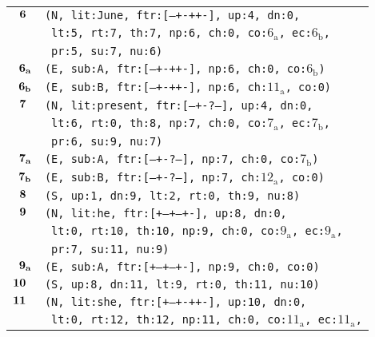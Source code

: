\documentclass{article}
\begin{document}
\begin{minipage}{\textwidth}
{\begin{tabular}{|r|l|}
    ${\textbf{\textrm{6}}_{\phantom{z}}}$ & \texttt{\texttt{(N,~lit:June,~ftr:[---+-++-],~up:4,~dn:0,}} \\
    & \texttt{\texttt{~lt:5,~rt:7,~th:7,~np:6,~ch:0,~co:${\textrm{6}_{\textrm{a}}}$,~ec:${\textrm{6}_{\textrm{b}}}$,}} \\
    & \texttt{\texttt{~pr:5,~su:7,~nu:6)}} \\
    ${\textbf{\textrm{6}}_{\textbf{\textrm{a}}}}$ & \texttt{\texttt{(E,~sub:A,~ftr:[---+-++-],~np:6,~ch:0,~co:${\textrm{6}_{\textrm{b}}}$)}} \\
    ${\textbf{\textrm{6}}_{\textbf{\textrm{b}}}}$ & \texttt{\texttt{(E,~sub:B,~ftr:[---+-++-],~np:6,~ch:${\textrm{11}_{\textrm{a}}}$,~co:0)}} \\
    ${\textbf{\textrm{7}}_{\phantom{z}}}$ & \texttt{\texttt{(N,~lit:present,~ftr:[---+-?--],~up:4,~dn:0,}} \\
    & \texttt{\texttt{~lt:6,~rt:0,~th:8,~np:7,~ch:0,~co:${\textrm{7}_{\textrm{a}}}$,~ec:${\textrm{7}_{\textrm{b}}}$,}} \\
    & \texttt{\texttt{~pr:6,~su:9,~nu:7)}} \\
    ${\textbf{\textrm{7}}_{\textbf{\textrm{a}}}}$ & \texttt{\texttt{(E,~sub:A,~ftr:[---+-?--],~np:7,~ch:0,~co:${\textrm{7}_{\textrm{b}}}$)}} \\
    ${\textbf{\textrm{7}}_{\textbf{\textrm{b}}}}$ & \texttt{\texttt{(E,~sub:B,~ftr:[---+-?--],~np:7,~ch:${\textrm{12}_{\textrm{a}}}$,~co:0)}} \\
    ${\textbf{\textrm{8}}_{\phantom{z}}}$ & \texttt{\texttt{(S,~up:1,~dn:9,~lt:2,~rt:0,~th:9,~nu:8)}} \\
    ${\textbf{\textrm{9}}_{\phantom{z}}}$ & \texttt{\texttt{(N,~lit:he,~ftr:[+--+--+-],~up:8,~dn:0,}} \\
    & \texttt{\texttt{~lt:0,~rt:10,~th:10,~np:9,~ch:0,~co:${\textrm{9}_{\textrm{a}}}$,~ec:${\textrm{9}_{\textrm{a}}}$,}} \\
    & \texttt{\texttt{~pr:7,~su:11,~nu:9)}} \\
    ${\textbf{\textrm{9}}_{\textbf{\textrm{a}}}}$ & \texttt{\texttt{(E,~sub:A,~ftr:[+--+--+-],~np:9,~ch:0,~co:0)}} \\
    ${\textbf{\textrm{10}}_{\phantom{z}}}$ & \texttt{\texttt{(S,~up:8,~dn:11,~lt:9,~rt:0,~th:11,~nu:10)}} \\
    ${\textbf{\textrm{11}}_{\phantom{z}}}$ & \texttt{\texttt{(N,~lit:she,~ftr:[+--+-++-],~up:10,~dn:0,}} \\
    & \texttt{\texttt{~lt:0,~rt:12,~th:12,~np:11,~ch:0,~co:${\textrm{11}_{\textrm{a}}}$,~ec:${\textrm{11}_{\textrm{a}}}$,}} \\

\end{tabular}}
\end{minipage}
\end{document}
